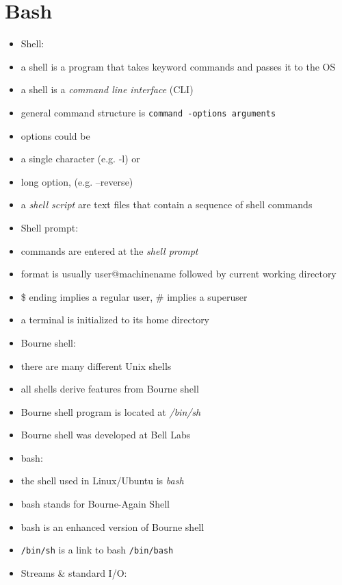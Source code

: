\documentclass[twocolumn]{IEEEtran} %
\begin{document}
\newpage
\section{Bash}
\begin{itemize}
    \item Shell:
	\bi
        \item a shell is a program that takes keyword commands and passes it to the OS
        \item a shell is a \emph{command line interface} (CLI)
		\item general command structure is \newline
		\verb|command -options arguments|
	    \item options could be
        \bi
            \item a single character (e.g. -l) or
            \item long option, (e.g. --reverse)
        \ei
        \item a \emph{shell script} are text files that contain a sequence of shell commands
    \ei
    \item Shell prompt:
    \bi
	   \item commands are entered at the \emph{shell prompt}
	   \item format is usually user@machinename followed by current working directory
	   	\item \$ ending implies a regular user, \# implies a superuser
	   	\item a terminal is initialized to its home directory
    \ei
    \item Bourne shell:
    \bi
        \item there are many different Unix shells
        \item all shells derive features from Bourne shell
        \item Bourne shell program is located at \emph{/bin/sh}
        \item Bourne shell was developed at Bell Labs
    \ei
    \item bash:
    \bi
        \item the shell used in Linux/Ubuntu is \emph{bash}
		\item bash stands for Bourne-Again Shell
        \item bash is an enhanced version of Bourne shell
        \item \verb|/bin/sh| is a link to bash \verb|/bin/bash|
	\ei
    \item Streams \& standard I/O:

\end{itemize}
\end{document}
